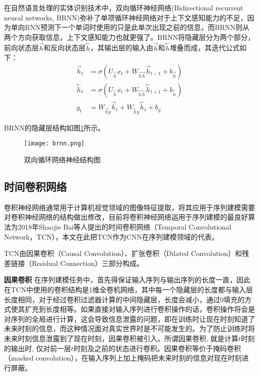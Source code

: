 在自然语言处理的实体识别技术中，双向循环神经网络(Bidirectional recurrent neural networks, BRNN)弥补了单项循环神经网络对于上下文感知能力的不足，因为单向RNN预测下一个单词时使用的只是此单次出现之前的信息，而BRNN则从两个方向获取信息，上下文感知能力也就更强了。BRNN将隐藏层分为两个部分，前向状态层$\stackrel{\rightarrow}{h}$和反向状态层$\stackrel{\leftarrow}{h}$，其输出层的输入由$\stackrel{\rightarrow}{h}$和$\stackrel{\leftarrow}{h}$堆叠而成，其迭代公式如下：
\begin{align} 
  \vec{h}_{t} &= \sigma(U_{\vec{h}} x_{t}+W_{\vec{h} \vec{h}} \vec{h}_{t-1}+b_{\vec{h}}) \label{forword}\\
\stackrel{\leftarrow}{h}_{t} &= \sigma(U_{\stackrel{\leftarrow}{h}} x_{t}+W_{\stackrel{\leftarrow}{h} \stackrel{\leftarrow}{h}} \stackrel{\leftarrow}{h}_{t+1}+b_{\stackrel{\leftarrow}{h}}) \label{backword}\\
y_{t} &= W_{\vec{h} y} \vec{h}_{t}+W_{\stackrel{\leftarrow}{h}y} \stackrel{\leftarrow}{h}_{t}+b_{y} \label{stack}
\end{align}

BRNN的隐藏层结构如图\ref{fig:brnn}所示。
\begin{figure}[htb]
  \centering
  \texttt{[image: brnn.png]}\\
  \caption{双向循环网络神经结构图}
  \label{fig:brnn}
\end{figure}

\subsection{时间卷积网络}
卷积神经网络通常用于计算机视觉领域的图像特征提取，将其应用于序列建模需要对卷积神经网络的结构做出修改，目前将卷积神经网络运用于序列建模的最良好算法为2018年Shaojie Bai等人提出的时间卷积网络（Temporal Convolutional Network，TCN），本文在此把TCN作为CNN在序列建模领域的代表。

TCN由因果卷积（Causal Convolution）、扩张卷积（Dilated Convolution）和残差链接（Residual Connection）三部分构成。

\textbf{因果卷积}
在序列建模任务中，首先得保证输入序列与输出序列的长度一直，因此在TCN中使用的卷积结构是1维全卷机网络，其中每一个隐藏层的长度都与输入层长度相同，对于经过卷积过滤器计算的中间隐藏层，长度会减小，通过0填充的方式使其扩充到长度相等。如果直接对输入序列进行卷积操作的话，卷积操作将会是对序列的全局进行计算，这会导致信息泄露的问题，即在训练时让现在时刻知道了未来时刻的信息，而这种情况面对真实世界时是不可能发生的。为了防止训练时将未来时刻信息泄露到了现在时刻，因果卷积被引入。所谓因果卷积, 就是计算$t$时刻的输出时, 仅对前一层$t$时刻及之前的状态进行卷积。因果卷积等价于掩码卷积（masked convolution），在输入序列上加上掩码把未来时刻的信息对现在时刻进行屏蔽。

